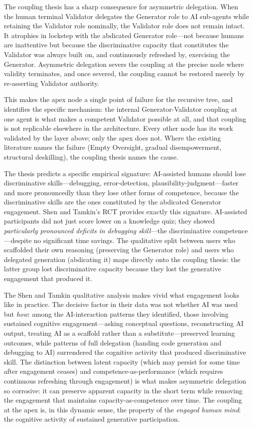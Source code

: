 \documentclass[11pt,a4paper]{article}
\begin{document}
The coupling thesis has a sharp consequence for asymmetric delegation. When the human terminal Validator delegates the Generator role to AI sub-agents while retaining the Validator role nominally, the Validator role does not remain intact. It atrophies in lockstep with the abdicated Generator role---not because humans are inattentive but because the discriminative capacity that constitutes the Validator was always built on, and continuously refreshed by, exercising the Generator. Asymmetric delegation severs the coupling at the precise node where validity terminates, and once severed, the coupling cannot be restored merely by re-asserting Validator authority.

This makes the apex node a single point of failure for the recursive tree, and identifies the specific mechanism: the internal Generator-Validator coupling at one agent is what makes a competent Validator possible at all, and that coupling is not replicable elsewhere in the architecture. Every other node has its work validated by the layer above; only the apex does not. Where the existing literature names the failure (Empty Oversight, gradual disempowerment, structural deskilling), the coupling thesis names the cause.

The thesis predicts a specific empirical signature: AI-assisted humans should lose discriminative skills---debugging, error-detection, plausibility-judgment---faster and more pronouncedly than they lose other forms of competence, because the discriminative skills are the ones constituted by the abdicated Generator engagement. Shen and Tamkin's RCT \citep{shen2026} provides exactly this signature. AI-assisted participants did not just score lower on a knowledge quiz; they showed \emph{particularly pronounced deficits in debugging skill}---the discriminative competence---despite no significant time savings. The qualitative split between users who scaffolded their own reasoning (preserving the Generator role) and users who delegated generation (abdicating it) maps directly onto the coupling thesis: the latter group lost discriminative capacity because they lost the generative engagement that produced it.

The Shen and Tamkin qualitative analysis makes vivid what engagement looks like in practice. The decisive factor in their data was not whether AI was used but \emph{how}: among the AI-interaction patterns they identified, those involving sustained cognitive engagement---asking conceptual questions, reconstructing AI output, treating AI as a scaffold rather than a substitute---preserved learning outcomes, while patterns of full delegation (handing code generation and debugging to AI) surrendered the cognitive activity that produced discriminative skill. The distinction between latent capacity (which may persist for some time after engagement ceases) and competence-as-performance (which requires continuous refreshing through engagement) is what makes asymmetric delegation so corrosive: it can preserve apparent capacity in the short term while removing the engagement that maintains capacity-as-competence over time. The coupling at the apex is, in this dynamic sense, the property of the \emph{engaged human mind}: the cognitive activity of sustained generative participation.
\end{document}
